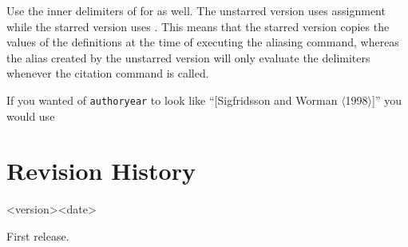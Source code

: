 \documentclass{ltxdockit}
\def\sty{\texttt}
\begin{document}
\begin{ltxsyntax}

Use the inner delimiters of  for
 as well.
The unstarred version uses  assignment while the starred version uses
. This means that the starred version copies the values of the
definitions at the time of executing the aliasing command,
whereas the alias created by the unstarred version will only evaluate the
delimiters whenever the citation command is called.

If you wanted  of \sty{authoryear} to look like
\enquote{[Sigfridsson and Worman $\langle$1998$\rangle$]} you would use
\begin{ltxexample}
\end{ltxexample}
\end{ltxsyntax}

\section{Revision History}\label{apx:log}
\begin{changelog}
\begin{release}{<version>}{<date>}
\item First release.
\end{release}
\end{changelog}

\begin{tcolorbox}[breakable]
\printbibliography
\end{tcolorbox}
\end{document}
